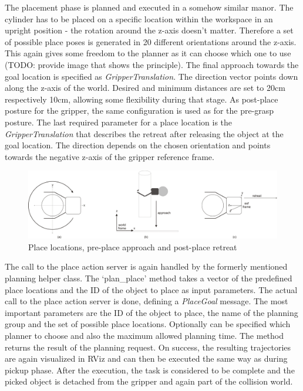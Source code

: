 The placement phase is planned and executed in a somehow similar manor. The cylinder has to be placed on a specific location within the workspace in an upright position - the rotation around the z-axis doesn't matter. Therefore a set of possible place poses is generated in 20 different orientations around the z-axis. This again gives some freedom to the planner as it can choose which one to use (TODO: provide image that shows the principle). The final approach towards the goal location is specified as \emph{GripperTranslation}. The direction vector points down along the z-axis of the world. Desired and minimum distances are set to 20cm respectively 10cm, allowing some flexibility during that stage. As post-place posture for the gripper, the same configuration is used as for the pre-grasp posture. The last required parameter for a place location is the \emph{GripperTranslation} that describes the retreat after releasing the object at the goal location. The direction depends on the chosen orientation and points towards the negative z-axis of the gripper reference frame. 

\begin{figure}[ht]
	\centering
  	\includegraphics[width=1.0\textwidth]{images/place_a-c.jpg}
	\caption{Place locations, pre-place approach and post-place retreat}
	\label{fig:place_stages}
\end{figure}

The call to the place action server is again handled by the formerly mentioned planning helper class. The `plan\_place' method takes a vector of the predefined place locations and the ID of the object to place as input parameters. The actual call to the place action server is done, defining a \emph{PlaceGoal} message. The most important parameters are the ID of the object to place, the name of the planning group and the set of possible place locations. Optionally can be specified which planner to choose and also the maximum allowed planning time. The method returns the result of the planning request. On success, the resulting trajectories are again visualized in RViz and can then be executed the same way as during pickup phase. After the execution, the task is considered to be complete and the picked object is detached from the gripper and again part of the collision world.


